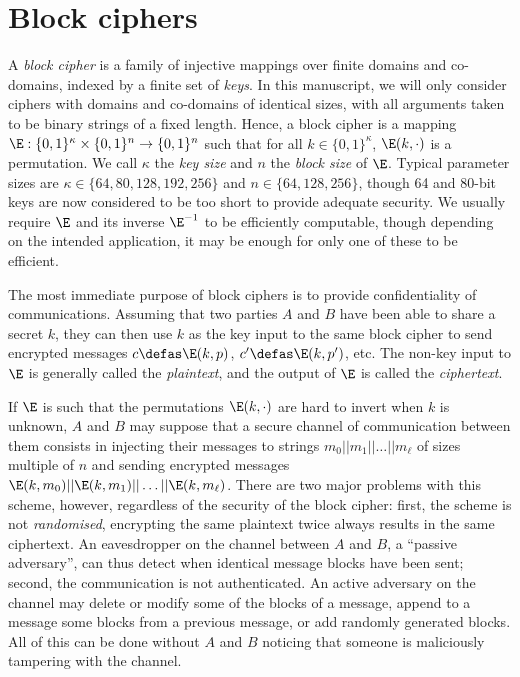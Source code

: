 \section{Block ciphers}

A \emph{block cipher} is a family of injective mappings over finite domains and co-domains, indexed by a finite set of \emph{keys}.
In this manuscript, we will only consider ciphers with domains and co-domains of identical sizes, with all arguments taken to be binary strings
of a fixed length.
Hence, a block cipher
is a mapping $\E : \{0,1\}^\kappa \times \{0,1\}^n \rightarrow \{0,1\}^n$ such that for all $k \in \{0,1\}^\kappa$, $\E(k,\cdot)$ is a permutation.
We call $\kappa$ the \emph{key size} and $n$ the \emph{block size} of $\E$. Typical parameter sizes are $\kappa \in \{64, 80, 128, 192, 256\}$
and $n \in \{64, 128, 256\}$, though
64 and 80-bit keys are now considered to be too short to provide adequate security.
We usually require $\E$ and its inverse $\E^{-1}$ to be efficiently computable, though depending on the intended application, it may be enough for only
one of these to be efficient.

The most immediate purpose of block ciphers is to provide confidentiality of communications. Assuming that two parties $A$ and $B$
have been able to share a secret $k$, they can then use $k$ as the key input to the same
block cipher to send encrypted messages $c \defas \E(k,p)$, $c' \defas \E(k,p')$, etc. The non-key input to $\E$ is generally called
the \emph{plaintext}, and the output of $\E$ is called the \emph{ciphertext}.

If $\E$ is such that the permutations $\E(k,\cdot)$ are hard to invert when $k$ is unknown, $A$ and $B$ may suppose that a secure channel of communication
between them consists in injecting their messages to strings $m_0||m_1||\ldots||m_\ell$ of sizes multiple of $n$ and sending encrypted messages
$\E(k,m_0)||\E(k,m_1)||\ldots||\E(k,m_\ell)$. There are two major problems with this scheme, however, regardless of the security of the block
cipher: first, the scheme is not \emph{randomised}, \ie encrypting the same plaintext twice always results in the same ciphertext. An eavesdropper
on the channel between $A$ and $B$, \ie a ``passive adversary'', can thus detect when identical message blocks have been sent; second, the
communication is not authenticated. An active adversary on the channel may delete or modify some of the blocks of a message, append to a message
some blocks from a previous message, or add randomly generated blocks. All of this can be done without $A$ and $B$ noticing that someone
is maliciously tampering with the channel.

